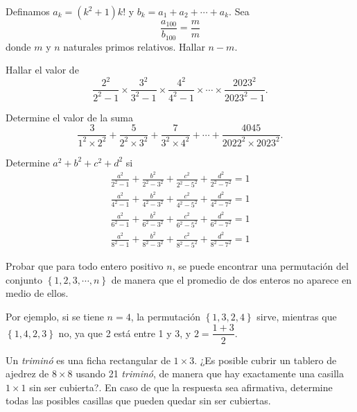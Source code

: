 \begin{section-problem}
    Definamos $a_k = (k^2 + 1)k!$ y $b_k = a_1 + a_2 + \cdots + a_k$.
    Sea
    \[\frac{a_{100}}{b_{100}} = \frac{m}{m}\]
    donde $m$ y $n$ naturales primos relativos.
    Hallar $n - m.$
\end{section-problem}

\begin{section-problem}
    Hallar el valor de
    \[\frac{2^2}{2^2 - 1} \times \frac{3^2}{3^2 - 1} \times \frac{4^2}{4^2 - 1} \times \cdots \times \frac{2023^2}{2023^2 - 1}.\]
\end{section-problem}

\begin{section-problem}
    Determine el valor de la suma
    \[\frac{3}{1^2\times 2^2} + \frac{5}{2^2\times 3^2} + \frac{7}{3^2\times 4^2} + \cdots + \frac{4045}{2022^2\times 2023^2}.\]
\end{section-problem}

\begin{section-problem}
    Determine $a^2 + b^2 + c^2 + d^2$ si
    \begin{gather*}
        \frac{a^2}{2^2 - 1} + \frac{b^2}{2^2 - 3^2} + \frac{c^2}{2^2 - 5^2} + \frac{d^2}{2^2 - 7^2} = 1\\
        \frac{a^2}{4^2 - 1} + \frac{b^2}{4^2 - 3^2} + \frac{c^2}{4^2 - 5^2} + \frac{d^2}{4^2 - 7^2} = 1\\
        \frac{a^2}{6^2 - 1} + \frac{b^2}{6^2 - 3^2} + \frac{c^2}{6^2 - 5^2} + \frac{d^2}{6^2 - 7^2} = 1\\
        \frac{a^2}{8^2 - 1} + \frac{b^2}{8^2 - 3^2} + \frac{c^2}{8^2 - 5^2} + \frac{d^2}{8^2 - 7^2} = 1
    \end{gather*}
\end{section-problem}

\begin{section-problem}
    Probar que para todo entero positivo $n$, se puede encontrar una permutación del conjunto $\left\{ 1, 2, 3 , \cdots, n \right\}$ de manera que el promedio de dos enteros no aparece en medio de ellos.
    
    Por ejemplo, si se tiene $n = 4$, la permutación $\left\{ 1, 3, 2, 4 \right\}$ sirve, mientras que $\left\{ 1, 4, 2, 3 \right\}$ no, ya que 2 está entre 1 y 3, y $2 = \dfrac{1 + 3}{2}$.
\end{section-problem}

\begin{section-problem}
    Un \textit{triminó} es una ficha rectangular de $1\times 3$.
    ¿Es posible cubrir un tablero de ajedrez de $8 \times 8$ usando 21 \textit{triminó}, de manera que hay exactamente una casilla $1 \times 1$ sin ser cubierta?.
    En caso de que la respuesta sea afirmativa, determine todas las posibles casillas que pueden quedar sin ser cubiertas.
\end{section-problem}

